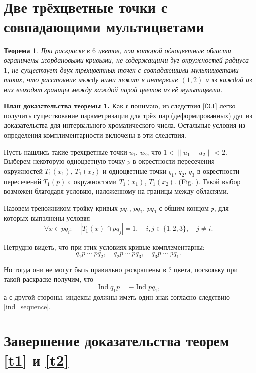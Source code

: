\documentclass[12pt,a4paper]{article}
\newtheorem{theorem}{Теорема}
\begin{document}
\section{Две трёхцветные точки с совпадающими мультицветами}

\begin{theorem} \label{t7}
	При раскраске в $6$ цветов, при которой одноцветные области ограничены жордановыми кривыми, не содержащими дуг окружностей радиуса $1$, не существует двух трёхцветных точек с совпадающими мультицветами таких, что расстояние между ними лежит в интервале $(1, 2)$ и из каждой из них выходят границы между каждой парой цветов из её мультицвета.
\end{theorem}

\textbf{План доказательства теоремы \ref{t7}.} Как я понимаю, из следствия \ref{f3.1} легко получить существование параметризации для трёх пар (деформированных) дуг из доказательства для интервального хроматического числа. Остальные условия из определения комплиментарности включены в эти следствия. 

Пусть нашлись такие трехцветные точки $u_1$, $u_2$, что $1 < \|u_1-u_2\|<2$. Выберем некоторую одноцветную точку $p$ в окрестности пересечения окружностей $T_1(x_1)$, $T_1(x_2)$ и одноцветные точки $q_1$, $q_2$, $q_3$ в окрестности пересечений $T_1(p)$ с окружностями $T_1(x_1)$, $T_1(x_2)$. (Fig. ). Такой выбор возможен благодаря условию, наложенному на границы между областями.

Назовем треножником тройку кривых $p q_1$, $p q_2$, $p q_3$ с общим концом $p$, для которых выполнены условия 
\[
   \forall x \in p q_i: \quad|T_1(x) \cap p q_j| = 1, \quad i,j \in \{1,2,3\},\quad j \neq i.
\]

Нетрудно видеть, что при этих условиях кривые комплементарны:
\[
    q_1 p \sim p q_2, \quad q_2 p \sim p q_3, \quad q_3 p \sim p q_1.
\]

Но тогда они не могут быть правильно раскрашены в 3 цвета, поскольку при такой раскраске получим, что
\[
    \operatorname{Ind} q_1 p = - \operatorname{Ind} p q_1,
\]
а с другой стороны, индексы должны иметь один знак согласно следствию \ref{ind_sequence}.


\section{Завершение доказательства теорем \ref{t1} и \ref{t2}}
\end{document}
